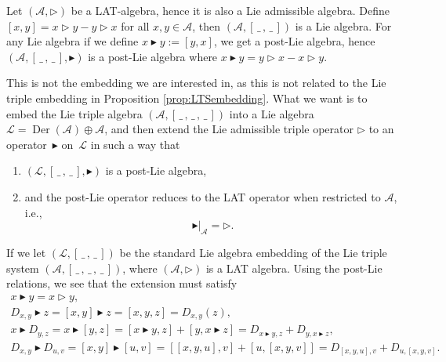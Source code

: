 \documentclass[10pt,a4paper]{amsart}
\newcommand{\Der}{\operatorname{Der}}
\newcommand{\noarg}{\,\_\,}
\numberwithin{equation}{section}
\begin{document}
\begin{Example}
Let $(\mathcal{A}, \rhd)$ be a LAT-algebra, hence it is also a Lie admissible algebra. Define $[x,y]=x\rhd y - y \rhd x$ for all $x,y \in \mathcal{A}$, then $(\mathcal{A},[\noarg,\noarg])$ is a Lie algebra. For any Lie algebra if we define $x \blacktriangleright y := [y,x]$, we get a post-Lie algebra, hence $(\mathcal{A},[\noarg,\noarg],\blacktriangleright)$ is a post-Lie algebra where $x\blacktriangleright y = y \rhd x - x \rhd y$.
\end{Example}

This is not the embedding we are interested in, as this is not related to the Lie triple embedding in Proposition \ref{prop:LTSembedding}. What we want is to embed the Lie triple algebra $(\mathcal{A},[\noarg,\noarg,\noarg])$ into a Lie algebra $\mathcal{L}=\Der(\mathcal{A})\oplus \mathcal{A}$, and then extend the Lie admissible triple operator $\rhd$ to an operator~$\blacktriangleright$ on~$\mathcal{L}$ in such a way that
\begin{enumerate}\itemsep=0pt
 \item[(i)] $(\mathcal{L},[\noarg,\noarg],\blacktriangleright)$ is a post-Lie algebra,
 \item[(ii)] and the post-Lie operator reduces to the LAT operator when restricted to $\mathcal{A}$, i.e.,
 \[
 \blacktriangleright \big|_{\mathcal{A}} = \rhd.
 \]
\end{enumerate}
If we let $(\mathcal{L},[\noarg,\noarg])$ be the standard Lie algebra embedding of the Lie triple system $(\mathcal{A},[\noarg,\noarg,\noarg])$, where $(\mathcal{A},\rhd)$ is a LAT algebra. %
Using the post-Lie relations, we see that the extension must satisfy 
\begin{gather*}
 x \blacktriangleright y = x \rhd y, \\
 D_{x,y} \blacktriangleright z = [x,y] \blacktriangleright z = [x,y,z] = D_{x,y} (z), \\
 x \blacktriangleright D_{y,z} = x \blacktriangleright [y,z] = [x\blacktriangleright y,z] + [y,x \blacktriangleright z] = D_{x\blacktriangleright y,z} + D_{y, x \blacktriangleright z} ,\\
 D_{x,y} \blacktriangleright D_{u,v} = [x,y] \blacktriangleright [u,v] = [[x,y,u],v] + [u,[x,y,v]] = D_{[x,y,u],v} + D_{u,[x,y,v]}.
\end{gather*}
\end{document}
